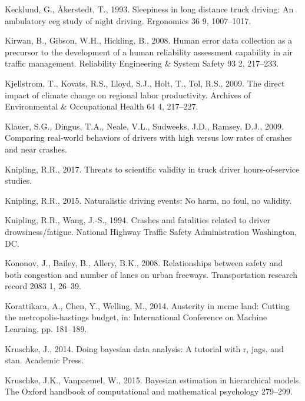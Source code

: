 \documentclass[12pt]{book}
\numberwithin{equation}{chapter}
\begin{document}
\leavevmode\hypertarget{ref-kecklund1993sleepiness}{}%
Kecklund, G., Åkerstedt, T., 1993. Sleepiness in long distance truck driving: An ambulatory eeg study of night driving. Ergonomics 36 9, 1007--1017.

\leavevmode\hypertarget{ref-kirwan2008human}{}%
Kirwan, B., Gibson, W.H., Hickling, B., 2008. Human error data collection as a precursor to the development of a human reliability assessment capability in air traffic management. Reliability Engineering \& System Safety 93 2, 217--233.

\leavevmode\hypertarget{ref-kjellstrom2009direct}{}%
Kjellstrom, T., Kovats, R.S., Lloyd, S.J., Holt, T., Tol, R.S., 2009. The direct impact of climate change on regional labor productivity. Archives of Environmental \& Occupational Health 64 4, 217--227.

\leavevmode\hypertarget{ref-klauer2009comparing}{}%
Klauer, S.G., Dingus, T.A., Neale, V.L., Sudweeks, J.D., Ramsey, D.J., 2009. Comparing real-world behaviors of drivers with high versus low rates of crashes and near crashes.

\leavevmode\hypertarget{ref-knipling2017threats}{}%
Knipling, R.R., 2017. Threats to scientific validity in truck driver hours-of-service studies.

\leavevmode\hypertarget{ref-knipling2015naturalistic}{}%
Knipling, R.R., 2015. Naturalistic driving events: No harm, no foul, no validity.

\leavevmode\hypertarget{ref-knipling1994crashes}{}%
Knipling, R.R., Wang, J.-S., 1994. Crashes and fatalities related to driver drowsiness/fatigue. National Highway Traffic Safety Administration Washington, DC.

\leavevmode\hypertarget{ref-kononov2008relationships}{}%
Kononov, J., Bailey, B., Allery, B.K., 2008. Relationships between safety and both congestion and number of lanes on urban freeways. Transportation research record 2083 1, 26--39.

\leavevmode\hypertarget{ref-korattikara2014austerity}{}%
Korattikara, A., Chen, Y., Welling, M., 2014. Austerity in mcmc land: Cutting the metropolis-hastings budget, in: International Conference on Machine Learning. pp. 181--189.

\leavevmode\hypertarget{ref-kruschke2014doing}{}%
Kruschke, J., 2014. Doing bayesian data analysis: A tutorial with r, jags, and stan. Academic Press.

\leavevmode\hypertarget{ref-kruschke2015bayesian}{}%
Kruschke, J.K., Vanpaemel, W., 2015. Bayesian estimation in hierarchical models. The Oxford handbook of computational and mathematical psychology 279--299.
\end{document}
